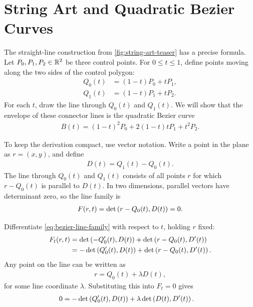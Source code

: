 \documentclass[11pt]{article}
\begin{document}
\section{String Art and Quadratic Bezier Curves}

The straight-line construction from \cref{fig:string-art-teaser} has a precise formula. Let \(P_0,P_1,P_2\in\mathbb{R}^2\) be three control points. For \(0\leq t\leq 1\), define points moving along the two sides of the control polygon:
\begin{align}
  Q_0(t)&=(1-t)P_0+tP_1,\\
  Q_1(t)&=(1-t)P_1+tP_2.
\end{align}
For each \(t\), draw the line through \(Q_0(t)\) and \(Q_1(t)\). We will show that the envelope of these connector lines is the quadratic Bezier curve
\begin{align}
  B(t)=(1-t)^2P_0+2(1-t)tP_1+t^2P_2.
  \label{eq:quadratic-bezier}
\end{align}

To keep the derivation compact, use vector notation. Write a point in the plane as \(r=(x,y)\), and define
\begin{align}
  D(t)=Q_1(t)-Q_0(t).
\end{align}
The line through \(Q_0(t)\) and \(Q_1(t)\) consists of all points \(r\) for which \(r-Q_0(t)\) is parallel to \(D(t)\). In two dimensions, parallel vectors have determinant zero, so the line family is
\begin{align}
  F(r,t)=\det\left( r-Q_0(t),D(t) \right)=0.
  \label{eq:bezier-line-family}
\end{align}

Differentiate \cref{eq:bezier-line-family} with respect to \(t\), holding \(r\) fixed:
\begin{align}
  F_t(r,t)
    &=
    \det\left( -Q_0'(t),D(t) \right)
    +
    \det\left( r-Q_0(t),D'(t) \right)\\
    &=
    -\det\left( Q_0'(t),D(t) \right)
    +
    \det\left( r-Q_0(t),D'(t) \right).
\end{align}
Any point on the line can be written as
\begin{align}
  r=Q_0(t)+\lambda D(t),
\end{align}
for some line coordinate \(\lambda\). Substituting this into \(F_t=0\) gives
\begin{align}
  0
    &=
    -\det\left( Q_0'(t),D(t) \right)
    +
    \lambda\det\left( D(t),D'(t) \right).
  \label{eq:lambda-envelope-condition}
\end{align}
\end{document}

